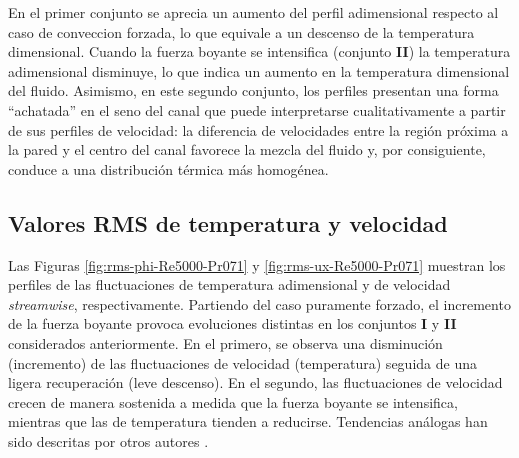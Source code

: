 En el primer conjunto se aprecia un aumento del perfil adimensional respecto al caso de conveccion forzada, lo que equivale a un descenso de la temperatura dimensional. Cuando la fuerza boyante se intensifica (conjunto \textbf{II}) la temperatura adimensional disminuye, lo que indica un aumento en la temperatura dimensional del fluido. Asimismo, en este segundo conjunto, los perfiles presentan una forma ``achatada'' en el seno del canal que puede interpretarse cualitativamente a partir de sus perfiles de velocidad: la diferencia de velocidades entre la región próxima a la pared y el centro del canal favorece la mezcla del fluido y, por consiguiente, conduce a una distribución térmica más homogénea.





%
%
%





\newpage
\subsection{Valores RMS de temperatura y velocidad} 

Las Figuras \ref{fig:rms-phi-Re5000-Pr071} y \ref{fig:rms-ux-Re5000-Pr071} muestran los perfiles de las fluctuaciones de temperatura adimensional y de velocidad \textit{streamwise}, respectivamente. Partiendo del caso puramente forzado, el incremento de la fuerza boyante provoca evoluciones distintas en los conjuntos \textbf{I} y \textbf{II} considerados anteriormente. En el primero, se observa una disminución (incremento) de las fluctuaciones de velocidad (temperatura) seguida de una ligera recuperación (leve descenso). En el segundo, las fluctuaciones de velocidad crecen de manera sostenida a medida que la fuerza boyante se intensifica, mientras que las de temperatura tienden a reducirse. Tendencias análogas han sido descritas por otros autores \cite{you2003direct,carr1973velocity}.

